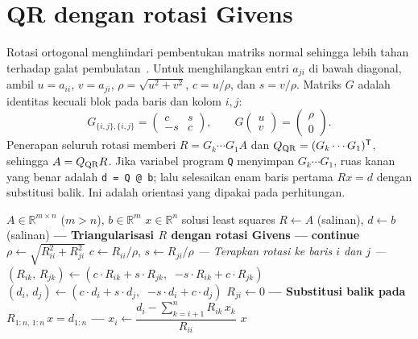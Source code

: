 \documentclass[11pt,a4paper]{article}
\newcommand{\R}{\mathbb{R}}
\numberwithin{equation}{section}
\begin{document}
\section{QR dengan rotasi Givens}
Rotasi ortogonal menghindari pembentukan matriks normal sehingga lebih tahan terhadap galat pembulatan~\cite{golub,trefethen,higham}. Untuk menghilangkan entri $a_{ji}$ di bawah diagonal, ambil $u=a_{ii}$, $v=a_{ji}$, $\rho=\sqrt{u^2+v^2}$, $c=u/\rho$, dan $s=v/\rho$. Matriks $G$ adalah identitas kecuali blok pada baris dan kolom $i,j$:
\begin{equation}
G_{\{i,j\},\{i,j\}}=\begin{pmatrix}c&s\\-s&c\end{pmatrix},\qquad
G\begin{pmatrix}u\\v\end{pmatrix}=\begin{pmatrix}\rho\\0\end{pmatrix}.
\end{equation}
Penerapan seluruh rotasi memberi $R=G_k\cdots G_1A$ dan $Q_{\rm QR}=(G_k\cdots G_1)^\mathsf{T}$, sehingga $A=Q_{\rm QR}R$. Jika variabel program \texttt{Q} menyimpan $G_k\cdots G_1$, ruas kanan yang benar adalah \texttt{d = Q @ b}; lalu selesaikan enam baris pertama $Rx=d$ dengan substitusi balik. Ini adalah orientasi yang dipakai pada perhitungan.

\begin{algorithm}[H]
\caption{Penyelesaian Least Squares via QR Rotasi Givens}
\begin{algorithmic}[1]
\Require $A\in\R^{m\times n}$ ($m > n$), $b\in\R^m$
\Ensure $x\in\R^n$ solusi least squares
\State $R \gets A$ (salinan), \; $d \gets b$ (salinan)
\Statex \textbf{--- Triangularisasi $R$ dengan rotasi Givens ---}
 
     
            \State \textbf{continue} 
        \EndIf
        \State $\rho \gets \sqrt{R_{ii}^2 + R_{ji}^2}$
        \State $c \gets R_{ii} / \rho$, \;\; $s \gets R_{ji} / \rho$
        \Statex \hspace{2.5em} \textit{--- Terapkan rotasi ke baris $i$ dan $j$ ---}
         
            \State $(R_{ik},\, R_{jk}) \gets (c \cdot R_{ik} + s \cdot R_{jk},\;\; {-s} \cdot R_{ik} + c \cdot R_{jk})$
        \EndFor
        \State $(d_i,\, d_j) \gets (c \cdot d_i + s \cdot d_j,\;\; {-s} \cdot d_i + c \cdot d_j)$ 
        \State $R_{ji} \gets 0$
    \EndFor
\EndFor
\Statex \textbf{--- Substitusi balik pada $R_{1:n,\,1:n}\, x = d_{1:n}$ ---}
    \State $x_i \gets \dfrac{d_i - \sum_{k=i+1}^{n} R_{ik}\, x_k}{R_{ii}}$
\EndFor
\State \Return $x$
\end{algorithmic}
\end{algorithm}
\end{document}
